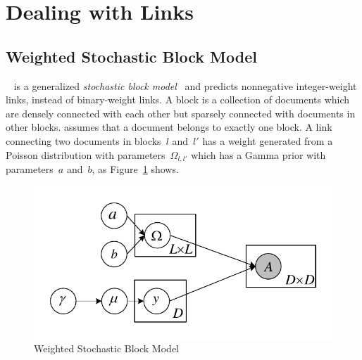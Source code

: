 \section{Dealing with Links}
\label{sec:links}



\subsection{Weighted Stochastic Block Model}
\label{ssec:wsbm}

\wsbm~\cite{aicher-2014-wsbm} is a generalized \emph{stochastic block
  model}~\cite[\sbm]{holland-1983-sbm,wang-1987-sbm-directed} and
predicts nonnegative integer-weight links, instead of binary-weight
links.  A block is a collection of documents which are densely
connected with each other but sparsely connected with documents in
other blocks.  \wsbm assumes that a document belongs to exactly one
block.  A link connecting two documents in blocks~$l$ and~$l'$ has a
weight generated from a Poisson distribution with parameters~$\Omega_{l,l'}$ which has a Gamma prior with parameters~$a$ and~$b$, as
Figure~\ref{fig:wsbm} shows.

\begin{figure}[t!]
  \centering
  \includegraphics[width=.8\linewidth]{2016_acl_docblock/figures/wsbm.pdf}
  \caption{Weighted Stochastic Block Model}\label{fig:wsbm}
\end{figure}

